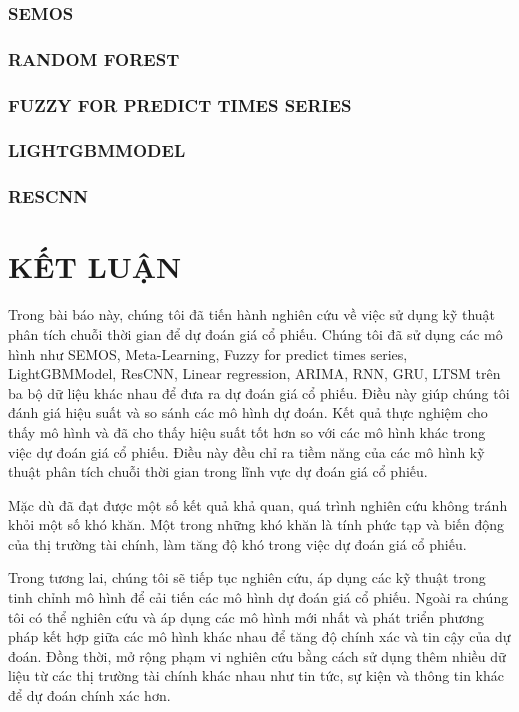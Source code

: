 \documentclass[conference]{IEEEtran}
\begin{document}
\subsubsection{SEMOS}
\subsubsection{RANDOM FOREST}
\subsubsection{FUZZY FOR PREDICT TIMES SERIES}
\subsubsection{LIGHTGBMMODEL}
\subsubsection{RESCNN}
\section{KẾT LUẬN}
Trong bài báo này, chúng tôi đã tiến hành nghiên cứu về việc sử dụng kỹ thuật phân tích chuỗi thời gian để dự đoán giá cổ phiếu. Chúng tôi đã sử dụng các mô hình như SEMOS, Meta-Learning, Fuzzy for predict times series, LightGBMModel, ResCNN, Linear regression, ARIMA, RNN, GRU, LTSM trên ba bộ dữ liệu khác nhau để đưa ra dự đoán giá cổ phiếu. Điều này giúp chúng tôi đánh giá hiệu suất và so sánh các mô hình dự đoán. Kết quả thực nghiệm cho thấy mô hình  và  đã cho thấy hiệu suất tốt hơn so với các mô hình khác trong việc dự đoán giá cổ phiếu. Điều này đều chỉ ra tiềm năng của các mô hình kỹ thuật phân tích chuỗi thời gian trong lĩnh vực dự đoán giá cổ phiếu.

Mặc dù đã đạt được một số kết quả khả quan, quá trình nghiên cứu không tránh khỏi một số khó khăn. Một trong những khó khăn là tính phức tạp và biến động của thị trường tài chính, làm tăng độ khó trong việc dự đoán giá cổ phiếu. 

Trong tương lai, chúng tôi sẽ tiếp tục nghiên cứu, áp dụng các kỹ thuật trong tinh chỉnh mô hình để cải tiến các mô hình dự đoán giá cổ phiếu. Ngoài ra chúng tôi có thể nghiên cứu và áp dụng các mô hình mới nhất và phát triển phương pháp kết hợp giữa các mô hình khác nhau để tăng độ chính xác và tin cậy của dự đoán. Đồng thời, mở rộng phạm vi nghiên cứu bằng cách sử dụng thêm nhiều dữ liệu từ các thị trường tài chính khác nhau như tin tức, sự kiện và thông tin khác để dự đoán chính xác hơn.
\end{document}
